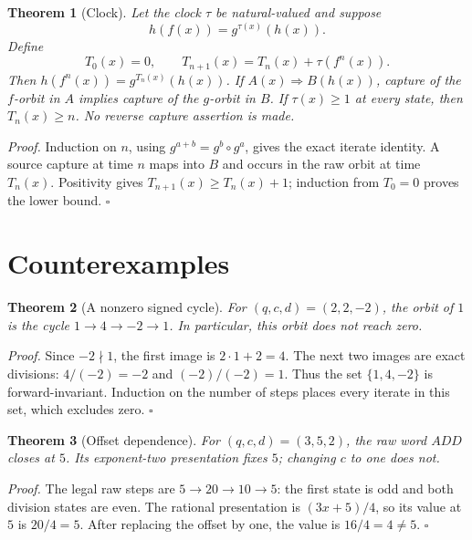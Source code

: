 \documentclass[11pt,letterpaper]{article}
\newtheorem{theorem}{Theorem}
\newenvironment{proof}{\noindent\textit{Proof.}}{\hfill\(\square\)}
\begin{document}
\begin{theorem}[Clock]
Let the clock \(\tau\) be natural-valued and suppose
\[
h(f(x))=g^{\tau(x)}(h(x)).
\]
Define
\[
T_0(x)=0,\qquad T_{n+1}(x)=T_n(x)+\tau(f^n(x)).
\]
Then \(h(f^n(x))=g^{T_n(x)}(h(x))\).
If \(A(x)\Rightarrow B(h(x))\), capture of the \(f\)-orbit in \(A\) implies
capture of the \(g\)-orbit in \(B\). If \(\tau(x)\ge1\) at every state, then
\(T_n(x)\ge n\). No reverse capture assertion is made.
\end{theorem}
\begin{proof}
Induction on \(n\), using \(g^{a+b}=g^b\circ g^a\), gives the exact iterate
identity. A source capture at time \(n\) maps into \(B\) and occurs in the raw
orbit at time \(T_n(x)\). Positivity gives
\(T_{n+1}(x)\ge T_n(x)+1\); induction from \(T_0=0\) proves the lower bound.
\end{proof}

\section{Counterexamples}

\begin{theorem}[A nonzero signed cycle]
For \((q,c,d)=(2,2,-2)\), the orbit of \(1\) is the cycle
\(1\to4\to-2\to1\). In particular, this orbit does not reach zero.
\end{theorem}
\begin{proof}
Since \(-2\nmid1\), the first image is \(2\cdot1+2=4\).
The next two images are exact divisions: \(4/(-2)=-2\) and
\((-2)/(-2)=1\). Thus the set \(\{1,4,-2\}\) is forward-invariant.
Induction on the number of steps places every iterate in this set, which excludes zero.
\end{proof}

\begin{theorem}[Offset dependence]
For \((q,c,d)=(3,5,2)\), the raw word \(ADD\) closes at \(5\).
Its exponent-two presentation fixes \(5\); changing \(c\) to one does not.
\end{theorem}
\begin{proof}
The legal raw steps are \(5\to20\to10\to5\): the first state is odd and
both division states are even. The rational presentation is
\((3x+5)/4\), so its value at \(5\) is \(20/4=5\).
After replacing the offset by one, the value is \(16/4=4\ne5\).
\end{proof}
\end{document}
